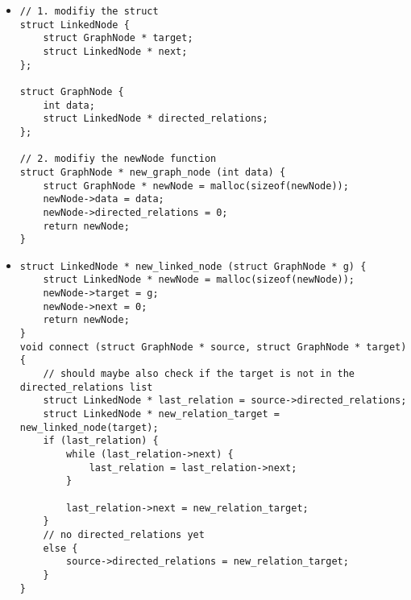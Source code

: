 \begin{itemize}
    \item {}

\begin{lstlisting}
// 1. modifiy the struct
struct LinkedNode {
    struct GraphNode * target;
    struct LinkedNode * next;
};

struct GraphNode {
    int data;
    struct LinkedNode * directed_relations;
};

// 2. modifiy the newNode function
struct GraphNode * new_graph_node (int data) {
    struct GraphNode * newNode = malloc(sizeof(newNode));
    newNode->data = data;
    newNode->directed_relations = 0;
    return newNode;
}
\end{lstlisting}

    \item {}

\begin{lstlisting}
struct LinkedNode * new_linked_node (struct GraphNode * g) {
    struct LinkedNode * newNode = malloc(sizeof(newNode));
    newNode->target = g;
    newNode->next = 0;
    return newNode;
}
void connect (struct GraphNode * source, struct GraphNode * target) {
    // should maybe also check if the target is not in the directed_relations list
    struct LinkedNode * last_relation = source->directed_relations;
    struct LinkedNode * new_relation_target = new_linked_node(target);
    if (last_relation) {
        while (last_relation->next) {
            last_relation = last_relation->next;
        }

        last_relation->next = new_relation_target;
    }
    // no directed_relations yet
    else {
        source->directed_relations = new_relation_target;
    }
}
\end{lstlisting}


\end{itemize}

